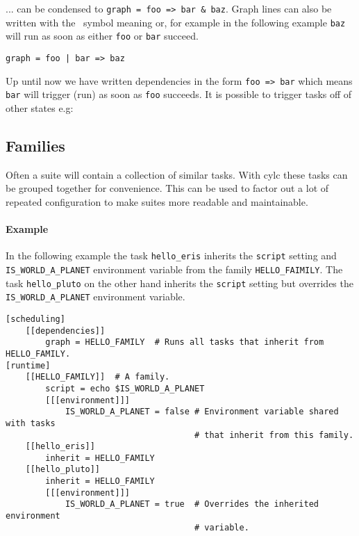 ... can be condensed to \lstinline{graph = foo => bar & baz}.
Graph lines can also be written with the \textbar \, symbol meaning or, for
example in the following example \lstinline{baz} will run as soon as either
\lstinline{foo} or \lstinline{bar} succeed.

\begin{lstlisting}
graph = foo | bar => baz
\end{lstlisting}

Up until now we have written dependencies in the form \lstinline{foo => bar}
which means \lstinline{bar} will trigger (run) as soon as \lstinline{foo}
succeeds. It is possible to trigger tasks off of other states e.g:



\subsection{Families}
\label{Families}

Often a suite will contain a collection of similar tasks. With cylc these
tasks can be grouped together for convenience. This can be used to factor out a lot of repeated configuration to make suites more readable and maintainable.

\paragraph*{Example}
In the following example the
task \lstinline{hello_eris} inherits the \lstinline{script} setting and
\lstinline{IS_WORLD_A_PLANET} environment variable from the family
\lstinline{HELLO_FAIMILY}. The task \lstinline{hello_pluto} on the other hand
inherits the \lstinline{script} setting but overrides the
\lstinline{IS_WORLD_A_PLANET} environment variable.

\begin{lstlisting}
[scheduling]
    [[dependencies]]
        graph = HELLO_FAMILY  # Runs all tasks that inherit from HELLO_FAMILY.
[runtime]
    [[HELLO_FAMILY]]  # A family.
        script = echo $IS_WORLD_A_PLANET
        [[[environment]]]
            IS_WORLD_A_PLANET = false # Environment variable shared with tasks
                                      # that inherit from this family.
    [[hello_eris]]
        inherit = HELLO_FAMILY
    [[hello_pluto]]
        inherit = HELLO_FAMILY
        [[[environment]]]
            IS_WORLD_A_PLANET = true  # Overrides the inherited environment
                                      # variable.
\end{lstlisting}

